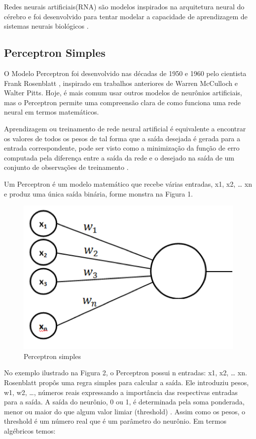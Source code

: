 \documentclass[conference]{IEEEtran}
\begin{document}
	Redes neurais artificiais(RNA) são modelos inspirados na arquitetura neural do cérebro e foi desenvolvido para tentar modelar a capacidade de aprendizagem de sistemas neurais biológicos \cite{b4}. 
	
	\subsection{Perceptron Simples}
	O Modelo Perceptron foi desenvolvido nas décadas de 1950 e 1960 pelo cientista Frank Rosenblatt \cite{b9}, inspirado em trabalhos anteriores de Warren McCulloch e Walter Pitts. Hoje, é mais comum usar outros modelos de neurônios artificiais, mas o Perceptron permite uma compreensão clara de como funciona uma rede neural em termos matemáticos.
	
	
    Aprendizagem ou treinamento de rede neural artificial é equivalente a encontrar os valores de todos os pesos de tal forma que a saída desejada é gerada para a entrada correspondente, pode ser visto como a minimização da função de erro computada pela diferença entre a saída da rede e o desejado na saída de um conjunto de observações de treinamento \cite{b6}.
	
	Um Perceptron é um modelo matemático que recebe várias entradas, x1, x2, … xn e produz uma única saída binária, forme monstra na Figura 1.
	
	\begin{figure}[htbp]
	\centerline{\includegraphics[scale=1]{Perceptron.png}}
	\caption{Perceptron simples}
	\label{fig}
	\end{figure}
	
	No exemplo ilustrado na Figura 2, o Perceptron possui n entradas: x1, x2, … xn. Rosenblatt propôs uma regra simples para calcular a saída. Ele introduziu pesos, w1, w2, …, números reais expressando a importância das respectivas entradas para a saída. A saída do neurônio, 0 ou 1, é determinada pela soma ponderada, menor ou maior do que algum valor limiar (threshold) \cite{b9}. Assim como os pesos, o threshold é um número real que é um parâmetro do neurônio. Em termos algébricos temos:
	
\end{document}
